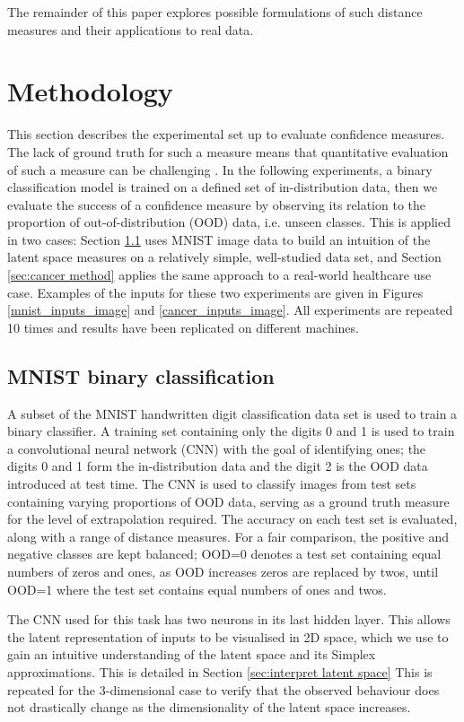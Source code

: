 \documentclass{article}
\begin{document}
The remainder of this paper explores possible formulations of such distance measures and their applications to real data.


\section{Methodology}

This section describes the experimental set up to evaluate confidence measures. The lack of ground truth for such a measure means that quantitative evaluation of such a measure can be challenging \cite{papernot_deep_2018}. In the following experiments, a binary classification model is trained on a defined set of in-distribution data, then we evaluate the success of a confidence measure by observing its relation to the proportion of out-of-distribution (OOD) data, i.e. unseen classes. This is applied in two cases: Section \ref{sec:mnist method} uses MNIST image data to build an intuition of the latent space measures on a relatively simple, well-studied data set, and Section \ref{sec:cancer method} applies the same approach to a real-world healthcare use case. Examples of the inputs for these two experiments are given in Figures \ref{mnist_inputs_image} and \ref{cancer_inputs_image}.
All experiments are repeated 10 times and results have been replicated on different machines.

\subsection{MNIST binary classification}
\label{sec:mnist method}
A subset of the MNIST handwritten digit classification data set \cite{deng2012mnist} is used to train a binary classifier. A training set containing only the digits 0 and 1 is used to train a convolutional neural network (CNN) with the goal of identifying ones; the digits 0 and 1 form the in-distribution data and the digit 2 is the OOD data introduced at test time. The CNN is used to classify images from test sets containing varying proportions of OOD data, serving as a ground truth measure for the level of extrapolation required. The accuracy on each test set is evaluated, along with a range of distance measures. For a fair comparison, the positive and negative classes are kept balanced; OOD=0 denotes a test set containing equal numbers of zeros and ones, as OOD increases zeros are replaced by twos, until OOD=1 where the test set contains equal numbers of ones and twos.

The CNN used for this task has two neurons in its last hidden layer. This allows the latent representation of inputs to be visualised in 2D space, which we use to gain an intuitive understanding of the latent space and its Simplex approximations. This is detailed in Section \ref{sec:interpret latent space} This is repeated for the 3-dimensional case to verify that the observed behaviour does not drastically change as the dimensionality of the latent space increases.
\end{document}
